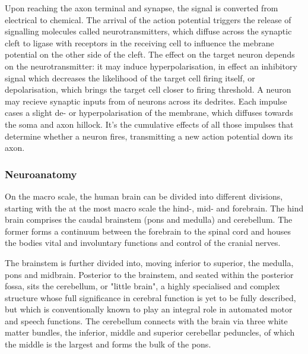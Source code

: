 Upon reaching the axon terminal and synapse, the signal is converted from electrical to chemical.
The arrival of the action potential triggers the release of signalling molecules called neurotransmitters, which diffuse across the synaptic cleft to ligase with receptors in the receiving cell to influence the mebrane potential on the other side of the cleft.
The effect on the target neuron depends on the neurotransmitter: it may induce hyperpolarisation, in effect an inhibitory signal which decreases the likelihood of the target cell firing itself, or depolarisation, which brings the target cell closer to firing threshold.
A neuron may recieve synaptic inputs from  of neurons across its dedrites.
Each impulse cases a slight de- or hyperpolarisation of the membrane, which diffuses towards the soma and axon hillock.
It's the cumulative effects of all those impulses that determine whether a neuron fires, transmitting a new action potential down its axon.


\subsubsection{Neuroanatomy}


On the macro scale, the human brain can be divided into  different divisions, starting with the at the most macro scale the hind-, mid- and forebrain.
The hind brain comprises the caudal brainstem (pons and medulla) and cerebellum.
The former forms a continuum between the forebrain to the spinal cord and houses the bodies vital and involuntary functions and control of the cranial nerves.

The brainstem is further divided into, moving inferior to superior, the medulla, pons and midbrain.
Posterior to the brainstem, and seated within the posterior fossa, sits the cerebellum, or "little brain",
a highly specialised and complex structure whose full significance in cerebral function is yet to be fully described, but which is conventionally known to play an integral role in automated motor and speech functions.
The cerebellum connects with the brain via three white matter bundles, the inferior, middle and superior cerebellar peduncles, of which the middle is the largest and forms the bulk of the pons. 

